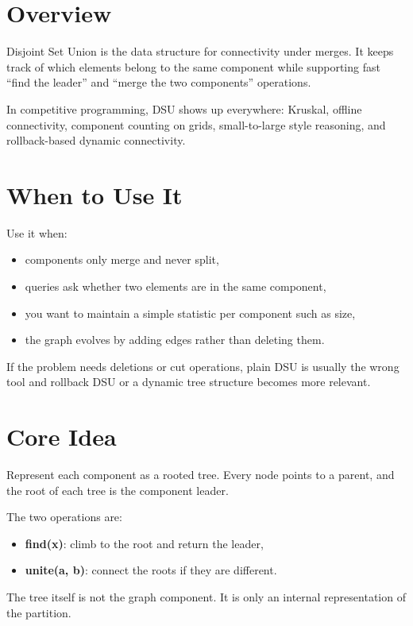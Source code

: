 \section*{Overview}

Disjoint Set Union is the data structure for connectivity under merges. It keeps track of which elements belong to the
same component while supporting fast ``find the leader'' and ``merge the two components'' operations.

In competitive programming, DSU shows up everywhere: Kruskal, offline connectivity, component counting on grids,
small-to-large style reasoning, and rollback-based dynamic connectivity.

\section*{When to Use It}

Use it when:

\begin{itemize}
  \item components only merge and never split,
  \item queries ask whether two elements are in the same component,
  \item you want to maintain a simple statistic per component such as size,
  \item the graph evolves by adding edges rather than deleting them.
\end{itemize}

If the problem needs deletions or cut operations, plain DSU is usually the wrong tool and rollback DSU or a dynamic
tree structure becomes more relevant.

\section*{Core Idea}

Represent each component as a rooted tree. Every node points to a parent, and the root of each tree is the component
leader.

The two operations are:

\begin{itemize}
  \item \textbf{find(x)}: climb to the root and return the leader,
  \item \textbf{unite(a, b)}: connect the roots if they are different.
\end{itemize}

The tree itself is not the graph component. It is only an internal representation of the partition.

